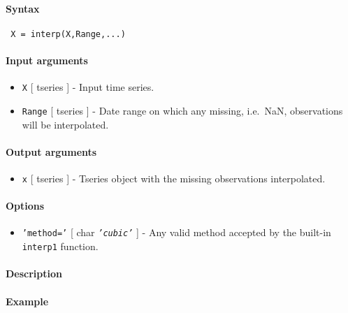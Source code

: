 


	\paragraph{Syntax}
 
 \begin{verbatim}
 X = interp(X,Range,...)
 \end{verbatim}
 
 \paragraph{Input arguments}
 
 \begin{itemize}
 \item
   \texttt{X} {[} tseries {]} - Input time series.
 \item
   \texttt{Range} {[} tseries {]} - Date range on which any missing,
   i.e.~NaN, observations will be interpolated.
 \end{itemize}
 
 \paragraph{Output arguments}
 
 \begin{itemize}
 \item
   \texttt{x} {[} tseries {]} - Tseries object with the missing
   observations interpolated.
 \end{itemize}
 
 \paragraph{Options}
 
 \begin{itemize}
 \item
   \texttt{'method='} {[} char \textbar{} \emph{\texttt{'cubic'}} {]} -
   Any valid method accepted by the built-in \texttt{interp1} function.
 \end{itemize}
 
 \paragraph{Description}
 
 \paragraph{Example}


